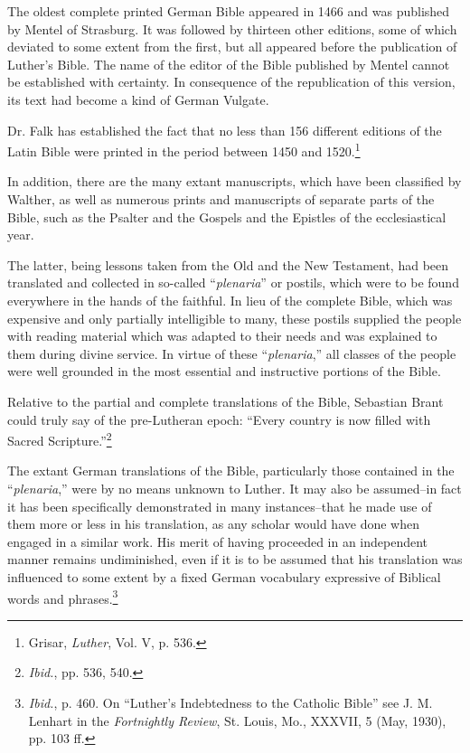 The oldest complete printed German Bible appeared in 1466 and was published
by Mentel of Strasburg. It was followed by thirteen other editions,
some of which deviated to some extent from the first, but all appeared
before the publication of Luther’s Bible. The name of the editor of the Bible
published by Mentel cannot be established with certainty. In consequence
of the republication of this version, its text had become a kind of German
Vulgate.

Dr. Falk has established the fact that no less than 156 different editions
of the Latin Bible were printed in the period between 1450 and 1520.\footnote{Grisar, \textit{Luther}, Vol. V, p. 536.}

In addition, there are the many extant manuscripts, which have been classified
by Walther, as well as numerous prints and manuscripts of separate
parts of the Bible, such as the Psalter and the Gospels and the Epistles of the
ecclesiastical year.

The latter, being lessons taken from the Old and the New Testament,
had been translated and collected in so-called ``\textit{plenaria}'' or postils, which
were to be found everywhere in the hands of the faithful. In lieu of the
complete Bible, which was expensive and only partially intelligible to many,
these postils supplied the people with reading material which was adapted
to their needs and was explained to them during divine service. In virtue of
these “\textit{plenaria},” all classes of the people were well grounded in the most
essential and instructive portions of the Bible.

Relative to the partial and complete translations of the Bible, Sebastian
Brant could truly say of the pre-Lutheran epoch: “Every
country is now filled with Sacred Scripture.”\footnote{\textit{Ibid.}, pp. 536, 540.}


The extant German translations of the Bible, particularly those contained
in the “\textit{plenaria},” were by no means unknown to Luther. It
may also be assumed--in fact it has been specifically demonstrated in
many instances--that he made use of them more or less in his translation,
as any scholar would have done when engaged in a similar
work. His merit of having proceeded in an independent manner remains undiminished,
even if it is to be assumed that his translation
was influenced to some extent by a fixed German vocabulary expressive
of Biblical words and phrases.\footnote
{\textit{Ibid.}, p. 460. On “Luther’s Indebtedness to the Catholic Bible” see J. M. Lenhart in
the \textit{Fortnightly Review}, St. Louis, Mo., XXXVII, 5 (May, 1930), pp. 103 ff.}

